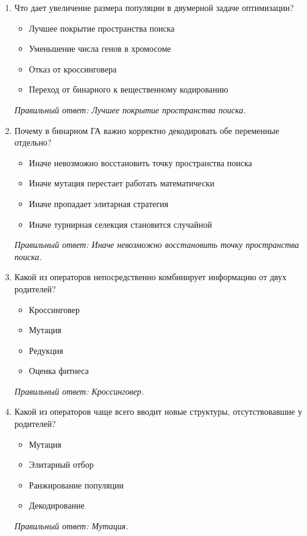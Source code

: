 \begin{enumerate}[label=\textbf{\arabic*.}, leftmargin=0pt, itemsep=1.2em]
\item Что дает увеличение размера популяции в двумерной задаче оптимизации?
\begin{itemize}[label=$\square$, leftmargin=1.5cm, itemsep=0.2em, topsep=0.3em]
\item Лучшее покрытие пространства поиска
\item Уменьшение числа генов в хромосоме
\item Отказ от кроссинговера
\item Переход от бинарного к вещественному кодированию
\end{itemize}
{\small\textit{Правильный ответ: Лучшее покрытие пространства поиска.}}

\item Почему в бинарном ГА важно корректно декодировать обе переменные отдельно?
\begin{itemize}[label=$\square$, leftmargin=1.5cm, itemsep=0.2em, topsep=0.3em]
\item Иначе невозможно восстановить точку пространства поиска
\item Иначе мутация перестает работать математически
\item Иначе пропадает элитарная стратегия
\item Иначе турнирная селекция становится случайной
\end{itemize}
{\small\textit{Правильный ответ: Иначе невозможно восстановить точку пространства поиска.}}

\item Какой из операторов непосредственно комбинирует информацию от двух родителей?
\begin{itemize}[label=$\square$, leftmargin=1.5cm, itemsep=0.2em, topsep=0.3em]
\item Кроссинговер
\item Мутация
\item Редукция
\item Оценка фитнеса
\end{itemize}
{\small\textit{Правильный ответ: Кроссинговер.}}

\item Какой из операторов чаще всего вводит новые структуры, отсутствовавшие у родителей?
\begin{itemize}[label=$\square$, leftmargin=1.5cm, itemsep=0.2em, topsep=0.3em]
\item Мутация
\item Элитарный отбор
\item Ранжирование популяции
\item Декодирование
\end{itemize}
{\small\textit{Правильный ответ: Мутация.}}


\end{enumerate}
